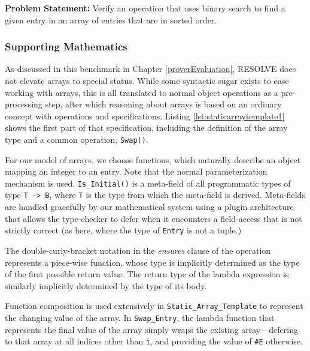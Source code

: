 \textbf{Problem Statement:} Verify an operation that uses binary search to find a given entry in an array of entries that are in sorted order.

		\subsubsection{Supporting Mathematics}	

As discussed in this benchmark in Chapter \ref{proverEvaluation}, RESOLVE does not elevate arrays to special status.  While some syntactic sugar exists to ease working with arrays, this is all translated to normal object operations as a pre-processing step, after which reasoning about arrays is based on an ordinary concept with operations and specifications.  Listing \ref{lst:staticarraytemplate1} shows the first part of that specification, including the definition of the array type and a common operation, \texttt{Swap()}.



For our model of arrays, we choose functions, which naturally describe an object mapping an integer to an entry.  Note that the normal parameterization mechanism is used.  \texttt{Is\_Initial()} is a meta-field of all programmatic types of type \texttt{T -> B}, where \texttt{T} is the type from which the meta-field is derived.  Meta-fields are handled gracefully by our mathematical system using a plugin architecture that allows the type-checker to defer when it encounters a field-access that is not strictly correct (as here, where the type of \texttt{Entry} is not a tuple.)

The double-curly-bracket notation in the \emph{ensures} clause of the operation represents a piece-wise function, whose type is implicitly determined as the type of the first possible return value.  The return type of the lambda expression is similarly implicitly determined by the type of its body.

Function composition is used extensively in \texttt{Static\_Array\_Template} to represent the changing value of the array.  In \texttt{Swap\_Entry}, the lambda function that represents the final value of the array simply wraps the existing array---defering to that array at all indices other than \texttt{i}, and providing the value of \texttt{\#E} otherwise.

